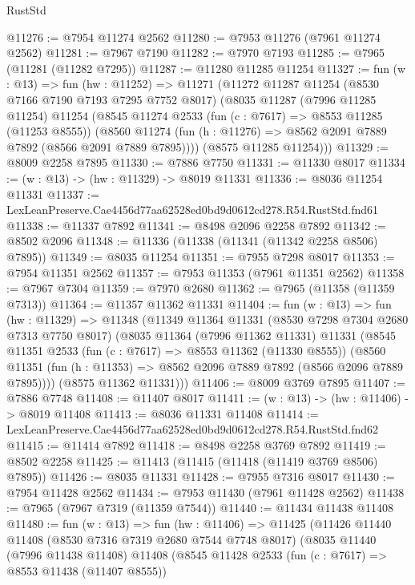 \begin{lexlean}{RustStd}
\begin{coremodule}
@11276 := @7954 @11274 @2562
@11280 := @7953 @11276 (@7961 @11274 @2562)
@11281 := @7967 @7190
@11282 := @7970 @7193
@11285 := @7965 (@11281 (@11282 @7295))
@11287 := @11280 @11285 @11254
@11327 := fun (w : @13) =>
  fun (hw : @11252) =>
  @11271
    (@11272
      @11287
      @11254
      (@8530 @7166 @7190 @7193 @7295 @7752 @8017)
      (@8035
        @11287
        (@7996 @11285 @11254)
        @11254
        (@8545
          @11274
          @2533
          (fun (c : @7617) => @8553 @11285 (@11253 @8555))
          (@8560 @11274 (fun (h : @11276) => @8562 @2091 @7889 @7892 (@8566 @2091 @7889 @7895))))
        (@8575 @11285 @11254)))
@11329 := @8009 @2258 @7895
@11330 := @7886 @7750
@11331 := @11330 @8017
@11334 := (w : @13) -> (hw : @11329) -> @8019 @11331
@11336 := @8036 @11254 @11331
@11337 := LexLeanPreserve.Cae4456d77aa62528ed0bd9d0612cd278.R54.RustStd.fnd61
@11338 := @11337 @7892
@11341 := @8498 @2096 @2258 @7892
@11342 := @8502 @2096
@11348 := @11336 (@11338 (@11341 (@11342 @2258 @8506) @7895))
@11349 := @8035 @11254
@11351 := @7955 @7298 @8017
@11353 := @7954 @11351 @2562
@11357 := @7953 @11353 (@7961 @11351 @2562)
@11358 := @7967 @7304
@11359 := @7970 @2680
@11362 := @7965 (@11358 (@11359 @7313))
@11364 := @11357 @11362 @11331
@11404 := fun (w : @13) =>
  fun (hw : @11329) =>
  @11348
    (@11349
      @11364
      @11331
      (@8530 @7298 @7304 @2680 @7313 @7750 @8017)
      (@8035
        @11364
        (@7996 @11362 @11331)
        @11331
        (@8545
          @11351
          @2533
          (fun (c : @7617) => @8553 @11362 (@11330 @8555))
          (@8560 @11351 (fun (h : @11353) => @8562 @2096 @7889 @7892 (@8566 @2096 @7889 @7895))))
        (@8575 @11362 @11331)))
@11406 := @8009 @3769 @7895
@11407 := @7886 @7748
@11408 := @11407 @8017
@11411 := (w : @13) -> (hw : @11406) -> @8019 @11408
@11413 := @8036 @11331 @11408
@11414 := LexLeanPreserve.Cae4456d77aa62528ed0bd9d0612cd278.R54.RustStd.fnd62
@11415 := @11414 @7892
@11418 := @8498 @2258 @3769 @7892
@11419 := @8502 @2258
@11425 := @11413 (@11415 (@11418 (@11419 @3769 @8506) @7895))
@11426 := @8035 @11331
@11428 := @7955 @7316 @8017
@11430 := @7954 @11428 @2562
@11434 := @7953 @11430 (@7961 @11428 @2562)
@11438 := @7965 (@7967 @7319 (@11359 @7544))
@11440 := @11434 @11438 @11408
@11480 := fun (w : @13) =>
  fun (hw : @11406) =>
  @11425
    (@11426
      @11440
      @11408
      (@8530 @7316 @7319 @2680 @7544 @7748 @8017)
      (@8035
        @11440
        (@7996 @11438 @11408)
        @11408
        (@8545
          @11428
          @2533
          (fun (c : @7617) => @8553 @11438 (@11407 @8555))

\end{coremodule}
\end{lexlean}
